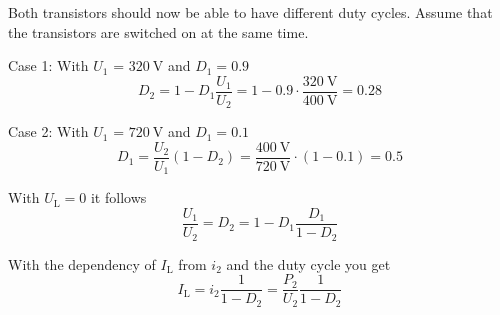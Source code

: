 \vspace{2em}\par
Both transistors should now be able to have different duty cycles. Assume that the transistors are switched on at the same time.


\begin{solutionblock}
    Case 1: With $U_\mathrm{1}$ = $\SI{320}{\volt}$ and $D_1 = 0.9$
    \begin{equation}
        D_2 = 1 - D_1 \frac{U_\mathrm{1}}{U_\mathrm{2}} = 1 - 0.9 \cdot \frac{\SI{320}{\volt}}{\SI{400}{\volt}}= 0.28
    \end{equation}

    
    


    Case 2: With $U_\mathrm{1}$ = $\SI{720}{\volt}$ and $D_1 = 0.1$
    \begin{equation}
        D_1 = \frac{U_\mathrm{2}}{U_\mathrm{1}} \left(1 - D_2 \right)= \frac{\SI{400}{\volt}}{\SI{720}{\volt}} \cdot \left(1 - 0.1\right) = 0.5
    \end{equation}
    
    
        
\end{solutionblock}

\begin{solutionblock}
    With $U_\mathrm{L} = 0$ it follows
    \begin{equation}
        \frac{U_\mathrm{1}}{U_\mathrm{2}} = D_2 = 1 - D_1 \frac{D_1}{1-D_2}
    \end{equation}
\end{solutionblock}


\begin{solutionblock}
    With the dependency of $I_\mathrm{L}$ from $i_\mathrm{2}$ and the duty cycle you get
    \begin{equation}
        I_\mathrm{L}=i_\mathrm{2} \frac{1}{1-D_2}= \frac{P_\mathrm{2}}{U_\mathrm{2}} \frac{1}{1-D_2}
    \end{equation}
\end{solutionblock}

